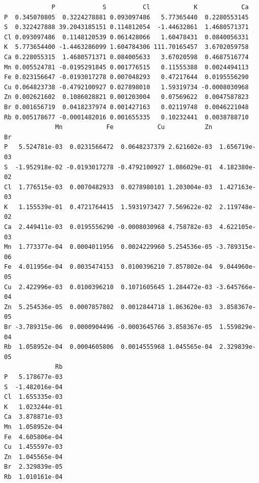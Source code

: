 \documentclass[
  letterpaper,
  DIV=11,
  numbers=noendperiod]{scrartcl}
\begin{document}
\begin{verbatim}
             P             S          Cl            K            Ca
P  0.345070805  0.3224278881 0.093097486   5.77365440  0.2280553145
S  0.322427888 39.2043185151 0.114812054  -1.44632861  1.4680571371
Cl 0.093097486  0.1148120539 0.061428066   1.60478431  0.0840056331
K  5.773654400 -1.4463286099 1.604784306 111.70165457  3.6702059758
Ca 0.228055315  1.4680571371 0.084005633   3.67020598  0.4687516774
Mn 0.005524781 -0.0195291845 0.001776515   0.11555388  0.0024494113
Fe 0.023156647 -0.0193017278 0.007048293   0.47217644  0.0195556290
Cu 0.064823738 -0.4792100927 0.027898010   1.59319734 -0.0008030968
Zn 0.002621602  0.1086028821 0.001203004   0.07569622  0.0047587823
Br 0.001656719  0.0418237974 0.001427163   0.02119748  0.0046221048
Rb 0.005178677 -0.0001482016 0.001655335   0.10232441  0.0038788710
              Mn            Fe            Cu           Zn            Br
P   5.524781e-03  0.0231566472  0.0648237379 2.621602e-03  1.656719e-03
S  -1.952918e-02 -0.0193017278 -0.4792100927 1.086029e-01  4.182380e-02
Cl  1.776515e-03  0.0070482933  0.0278980101 1.203004e-03  1.427163e-03
K   1.155539e-01  0.4721764415  1.5931973427 7.569622e-02  2.119748e-02
Ca  2.449411e-03  0.0195556290 -0.0008030968 4.758782e-03  4.622105e-03
Mn  1.773377e-04  0.0004011956  0.0024229960 5.254536e-05 -3.789315e-06
Fe  4.011956e-04  0.0035474153  0.0100396210 7.857802e-04  9.044960e-05
Cu  2.422996e-03  0.0100396210  0.1071605645 1.284472e-03 -3.645766e-04
Zn  5.254536e-05  0.0007857802  0.0012844718 1.863620e-03  3.858367e-05
Br -3.789315e-06  0.0000904496 -0.0003645766 3.858367e-05  1.559829e-04
Rb  1.058952e-04  0.0004605806  0.0014555968 1.045565e-04  2.329839e-05
              Rb
P   5.178677e-03
S  -1.482016e-04
Cl  1.655335e-03
K   1.023244e-01
Ca  3.878871e-03
Mn  1.058952e-04
Fe  4.605806e-04
Cu  1.455597e-03
Zn  1.045565e-04
Br  2.329839e-05
Rb  1.010161e-04
\end{verbatim}
\end{document}

